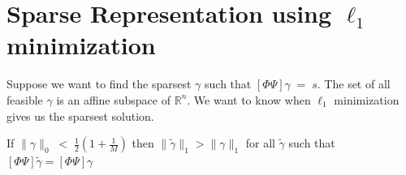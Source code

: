 \documentclass[12pt]{report}
\begin{document}
\section{Sparse Representation using $\ell_1$ minimization}
Suppose we want to find the sparsest $\gamma$ such that $\left[ \Phi \Psi \right] \gamma \; = \; s$.
The set of all feasible $\gamma$ is an affine subspace of $\mathbb{R}^n$. We want to know when
$\ell_1$ minimization gives us the sparsest solution.

\begin{theorem}
\label{DonohoHuo}
 If $\lVert\gamma\rVert_0 \; < \; \frac{1}{2}(1+\frac{1}{M})$ then $\|\widetilde{\gamma}\|_1 > \|\gamma\|_1$ for all
$\widetilde{\gamma}$ such that $\left[ \Phi \Psi \right] \widetilde{\gamma} = \left[ \Phi \Psi \right] \gamma$
\end{theorem}
\end{document}
